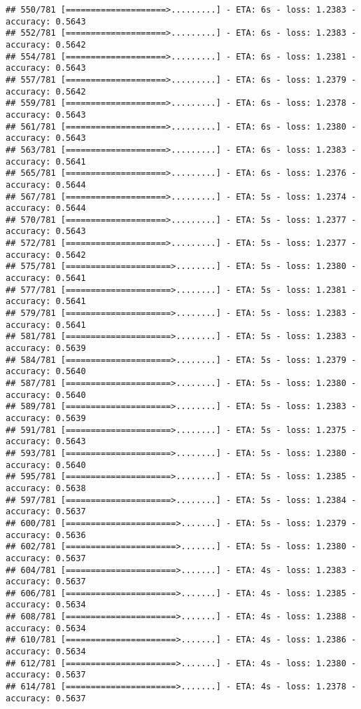 \documentclass[
]{article}
\begin{document}
\begin{verbatim}
## 550/781 [====================>.........] - ETA: 6s - loss: 1.2383 - accuracy: 0.5643
## 552/781 [====================>.........] - ETA: 6s - loss: 1.2383 - accuracy: 0.5642
## 554/781 [====================>.........] - ETA: 6s - loss: 1.2381 - accuracy: 0.5643
## 557/781 [====================>.........] - ETA: 6s - loss: 1.2379 - accuracy: 0.5642
## 559/781 [====================>.........] - ETA: 6s - loss: 1.2378 - accuracy: 0.5643
## 561/781 [====================>.........] - ETA: 6s - loss: 1.2380 - accuracy: 0.5643
## 563/781 [====================>.........] - ETA: 6s - loss: 1.2383 - accuracy: 0.5641
## 565/781 [====================>.........] - ETA: 6s - loss: 1.2376 - accuracy: 0.5644
## 567/781 [====================>.........] - ETA: 5s - loss: 1.2374 - accuracy: 0.5644
## 570/781 [====================>.........] - ETA: 5s - loss: 1.2377 - accuracy: 0.5643
## 572/781 [====================>.........] - ETA: 5s - loss: 1.2377 - accuracy: 0.5642
## 575/781 [=====================>........] - ETA: 5s - loss: 1.2380 - accuracy: 0.5641
## 577/781 [=====================>........] - ETA: 5s - loss: 1.2381 - accuracy: 0.5641
## 579/781 [=====================>........] - ETA: 5s - loss: 1.2383 - accuracy: 0.5641
## 581/781 [=====================>........] - ETA: 5s - loss: 1.2383 - accuracy: 0.5639
## 584/781 [=====================>........] - ETA: 5s - loss: 1.2379 - accuracy: 0.5640
## 587/781 [=====================>........] - ETA: 5s - loss: 1.2380 - accuracy: 0.5640
## 589/781 [=====================>........] - ETA: 5s - loss: 1.2383 - accuracy: 0.5639
## 591/781 [=====================>........] - ETA: 5s - loss: 1.2375 - accuracy: 0.5643
## 593/781 [=====================>........] - ETA: 5s - loss: 1.2380 - accuracy: 0.5640
## 595/781 [=====================>........] - ETA: 5s - loss: 1.2385 - accuracy: 0.5638
## 597/781 [=====================>........] - ETA: 5s - loss: 1.2384 - accuracy: 0.5637
## 600/781 [======================>.......] - ETA: 5s - loss: 1.2379 - accuracy: 0.5636
## 602/781 [======================>.......] - ETA: 5s - loss: 1.2380 - accuracy: 0.5637
## 604/781 [======================>.......] - ETA: 4s - loss: 1.2383 - accuracy: 0.5637
## 606/781 [======================>.......] - ETA: 4s - loss: 1.2385 - accuracy: 0.5634
## 608/781 [======================>.......] - ETA: 4s - loss: 1.2388 - accuracy: 0.5634
## 610/781 [======================>.......] - ETA: 4s - loss: 1.2386 - accuracy: 0.5634
## 612/781 [======================>.......] - ETA: 4s - loss: 1.2380 - accuracy: 0.5637
## 614/781 [======================>.......] - ETA: 4s - loss: 1.2378 - accuracy: 0.5637

\end{verbatim}
\end{document}
